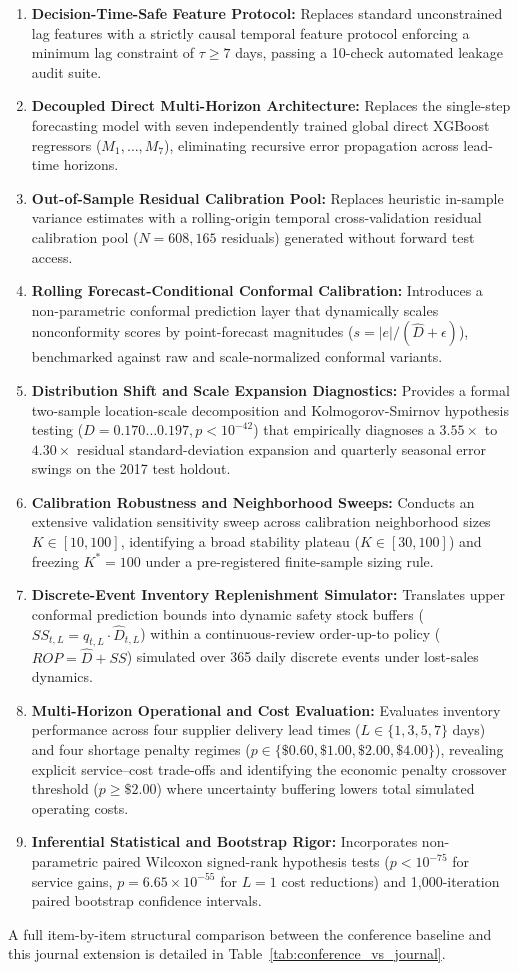 \begin{enumerate}
    \item \textbf{Decision-Time-Safe Feature Protocol:} Replaces standard unconstrained lag features with a strictly causal temporal feature protocol enforcing a minimum lag constraint of $\tau \ge 7$ days, passing a 10-check automated leakage audit suite.
    \item \textbf{Decoupled Direct Multi-Horizon Architecture:} Replaces the single-step forecasting model with seven independently trained global direct XGBoost regressors ($M_1, \dots, M_7$), eliminating recursive error propagation across lead-time horizons.
    \item \textbf{Out-of-Sample Residual Calibration Pool:} Replaces heuristic in-sample variance estimates with a rolling-origin temporal cross-validation residual calibration pool ($N = 608,165$ residuals) generated without forward test access.
    \item \textbf{Rolling Forecast-Conditional Conformal Calibration:} Introduces a non-parametric conformal prediction layer that dynamically scales nonconformity scores by point-forecast magnitudes ($s = |e| / (\hat{D} + \epsilon)$), benchmarked against raw and scale-normalized conformal variants.
    \item \textbf{Distribution Shift and Scale Expansion Diagnostics:} Provides a formal two-sample location-scale decomposition and Kolmogorov-Smirnov hypothesis testing ($D = 0.170\dots0.197, p < 10^{-42}$) that empirically diagnoses a $3.55\times$ to $4.30\times$ residual standard-deviation expansion and quarterly seasonal error swings on the 2017 test holdout.
    \item \textbf{Calibration Robustness and Neighborhood Sweeps:} Conducts an extensive validation sensitivity sweep across calibration neighborhood sizes $K \in [10, 100]$, identifying a broad stability plateau ($K \in [30, 100]$) and freezing $K^* = 100$ under a pre-registered finite-sample sizing rule.
    \item \textbf{Discrete-Event Inventory Replenishment Simulator:} Translates upper conformal prediction bounds into dynamic safety stock buffers ($SS_{t,L} = q_{t,L} \cdot \hat{D}_{t,L}$) within a continuous-review order-up-to policy ($ROP = \hat{D} + SS$) simulated over 365 daily discrete events under lost-sales dynamics.
    \item \textbf{Multi-Horizon Operational and Cost Evaluation:} Evaluates inventory performance across four supplier delivery lead times ($L \in \{1, 3, 5, 7\}$ days) and four shortage penalty regimes ($p \in \{\$0.60, \$1.00, \$2.00, \$4.00\}$), revealing explicit service--cost trade-offs and identifying the economic penalty crossover threshold ($p \ge \$2.00$) where uncertainty buffering lowers total simulated operating costs.
    \item \textbf{Inferential Statistical and Bootstrap Rigor:} Incorporates non-parametric paired Wilcoxon signed-rank hypothesis tests ($p < 10^{-75}$ for service gains, $p = 6.65 \times 10^{-55}$ for $L=1$ cost reductions) and 1,000-iteration paired bootstrap confidence intervals.
\end{enumerate}

\noindent A full item-by-item structural comparison between the conference baseline and this journal extension is detailed in Table~\ref{tab:conference_vs_journal}.
